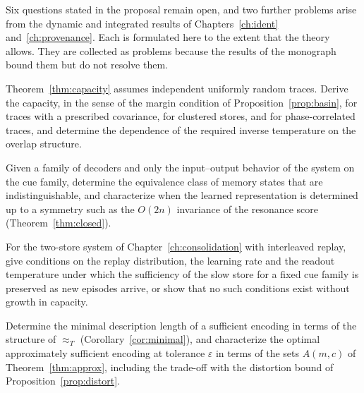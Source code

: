 Six questions stated in the proposal remain open, and two further problems arise from the dynamic and integrated results of Chapters~\ref{ch:ident} and~\ref{ch:provenance}. Each is formulated here to the extent that the theory allows. They are collected as problems because the results of the monograph bound them but do not resolve them.

\begin{problem}\label{prob:capcorr}
Theorem~\ref{thm:capacity} assumes independent uniformly random traces. Derive the capacity, in the sense of the margin condition of Proposition~\ref{prop:basin}, for traces with a prescribed covariance, for clustered stores, and for phase-correlated traces, and determine the dependence of the required inverse temperature on the overlap structure.
\end{problem}

\begin{problem}\label{prob:identifiability}
Given a family of decoders and only the input--output behavior of the system on the cue family, determine the equivalence class of memory states that are indistinguishable, and characterize when the learned representation is determined up to a symmetry such as the $O(2n)$ invariance of the resonance score (Theorem~\ref{thm:closed}).
\end{problem}

\begin{problem}\label{prob:continual}
For the two-store system of Chapter~\ref{ch:consolidation} with interleaved replay, give conditions on the replay distribution, the learning rate and the readout temperature under which the sufficiency of the slow store for a fixed cue family is preserved as new episodes arrive, or show that no such conditions exist without growth in capacity.
\end{problem}

\begin{problem}\label{prob:optcomp}
Determine the minimal description length of a sufficient encoding in terms of the structure of $\approx_T$ (Corollary~\ref{cor:minimal}), and characterize the optimal approximately sufficient encoding at tolerance $\varepsilon$ in terms of the sets $A(m,c)$ of Theorem~\ref{thm:approx}, including the trade-off with the distortion bound of Proposition~\ref{prop:distort}.
\end{problem}

